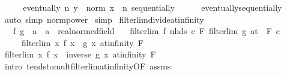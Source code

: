 \begin{isabellebody}
\ \ \isamarkupfalse%
\ \isamarkupfalse%
\ {\isachardoublequoteopen}eventually\ {\isacharparenleft}{\kern0pt}{\isasymlambda}n{\isachardot}{\kern0pt}\ y\ {\isasymle}\ norm\ {\isacharparenleft}{\kern0pt}x\ {\isacharcircum}{\kern0pt}\ n{\isacharparenright}{\kern0pt}{\isacharparenright}{\kern0pt}\ sequentially{\isachardoublequoteclose}\isanewline
\ \ \ \ \isamarkupfalse%
\ eventually{\isacharunderscore}{\kern0pt}sequentially\isanewline
\ \ \ \ \isamarkupfalse%
\ {\isacharparenleft}{\kern0pt}auto\ simp{\isacharcolon}{\kern0pt}\ norm{\isacharunderscore}{\kern0pt}power{\isacharparenright}{\kern0pt}\isanewline
{}\isamarkupfalse%
\ simp%
\endisatagproof
{\isafoldproof}%
%
\isadelimproof
\isanewline
%
\endisadelimproof
\isanewline
\isanewline
{}\isamarkupfalse%
\ filterlim{\isacharunderscore}{\kern0pt}divide{\isacharunderscore}{\kern0pt}at{\isacharunderscore}{\kern0pt}infinity{\isacharcolon}{\kern0pt}\isanewline
\ \ \ f\ g\ {\isacharcolon}{\kern0pt}{\isacharcolon}{\kern0pt}\ {\isachardoublequoteopen}{\isacharprime}{\kern0pt}a\ {\isasymRightarrow}\ {\isacharprime}{\kern0pt}a\ {\isacharcolon}{\kern0pt}{\isacharcolon}{\kern0pt}\ real{\isacharunderscore}{\kern0pt}normed{\isacharunderscore}{\kern0pt}field{\isachardoublequoteclose}\isanewline
\ \ \ {\isachardoublequoteopen}filterlim\ f\ {\isacharparenleft}{\kern0pt}nhds\ c{\isacharparenright}{\kern0pt}\ F{\isachardoublequoteclose}\ {\isachardoublequoteopen}filterlim\ g\ {\isacharparenleft}{\kern0pt}at\ {}{\isacharparenright}{\kern0pt}\ F{\isachardoublequoteclose}\ {\isachardoublequoteopen}c\ {\isasymnoteq}\ {}{\isachardoublequoteclose}\isanewline
\ \ \ \ \ {\isachardoublequoteopen}filterlim\ {\isacharparenleft}{\kern0pt}{\isasymlambda}x{\isachardot}{\kern0pt}\ f\ x\ {\isacharslash}{\kern0pt}\ g\ x{\isacharparenright}{\kern0pt}\ at{\isacharunderscore}{\kern0pt}infinity\ F{\isachardoublequoteclose}\isanewline
%
\isadelimproof
%
\endisadelimproof
%
\isatagproof
{}\isamarkupfalse%
\ {\isacharminus}{\kern0pt}\isanewline
\ \ \isamarkupfalse%
\ {\isachardoublequoteopen}filterlim\ {\isacharparenleft}{\kern0pt}{\isasymlambda}x{\isachardot}{\kern0pt}\ f\ x\ {\isacharasterisk}{\kern0pt}\ inverse\ {\isacharparenleft}{\kern0pt}g\ x{\isacharparenright}{\kern0pt}{\isacharparenright}{\kern0pt}\ at{\isacharunderscore}{\kern0pt}infinity\ F{\isachardoublequoteclose}\isanewline
\ \ \ \ \isamarkupfalse%
\ {\isacharparenleft}{\kern0pt}intro\ tendsto{\isacharunderscore}{\kern0pt}mult{\isacharunderscore}{\kern0pt}filterlim{\isacharunderscore}{\kern0pt}at{\isacharunderscore}{\kern0pt}infinity{\isacharbrackleft}{\kern0pt}OF\ assms{\isacharparenleft}{\kern0pt}{}{\isacharcomma}{\kern0pt}{}{\isacharparenright}{\kern0pt}{\isacharbrackright}{\kern0pt}\isanewline

\end{isabellebody}
